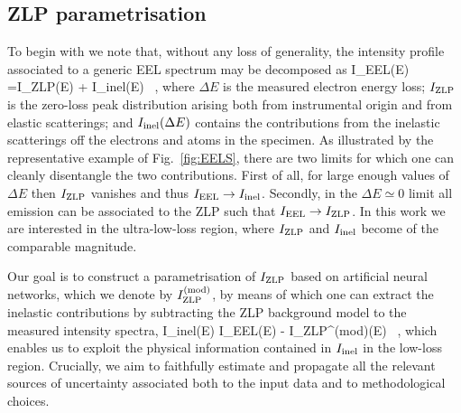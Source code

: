 \subsection{ZLP parametrisation}
\label{sec:parametrisation}

To begin with we note that, without any loss of generality, the intensity profile
associated to a generic EEL spectrum may be decomposed as
\be
\label{eq:IeelTot}
I_{\rm EEL}(\Delta E) =I_{\rm ZLP}(\Delta E) + I_{\rm inel}(\Delta E) \, ,
\ee
where $\Delta E$ is the measured electron energy loss; $I_{\rm ZLP}$ is the zero-loss peak
distribution arising both from instrumental origin  and from elastic scatterings; and
$I_{\rm inel}(\Delta E)$ contains the contributions from the
inelastic scatterings off the electrons and atoms in the specimen.
%
As illustrated by the representative example of Fig.~\ref{fig:EELS}, there are two limits
for which one can cleanly disentangle the two contributions.
%
First of all, for large enough values of
$\Delta E$ then
$I_{\rm ZLP}$ vanishes and thus $I_{\rm EEL} \to I_{\rm inel}$.
%
Secondly, in the $\Delta E\simeq 0$ limit all emission can be associated to
 the ZLP such that $I_{\rm EEL}\to  I_{\rm ZLP}$.
%
In this work we are interested in the ultra-low-loss region, where $I_{\rm ZLP}$ and $I_{\rm inel}$
become of the comparable magnitude.

Our goal is to construct a parametrisation of $I_{\rm ZLP}$ based on artificial
neural networks, which we denote by $I_{\rm ZLP}^{\rm (mod)}$, by means of which one
can extract the inelastic contributions by subtracting the
ZLP background model to the measured intensity spectra,
\be
\label{eq:ZLPseparation}
I_{\rm inel}(\Delta E) \simeq I_{\rm EEL}(\Delta E) - I_{\rm ZLP}^{\rm (mod)}(\Delta E) \, ,
\ee
which enables us to exploit the physical information contained in $I_{\rm inel}$ in
the low-loss region.
%
Crucially, we aim to faithfully estimate and propagate all the relevant sources of uncertainty associated
both to the input data and to methodological choices.

